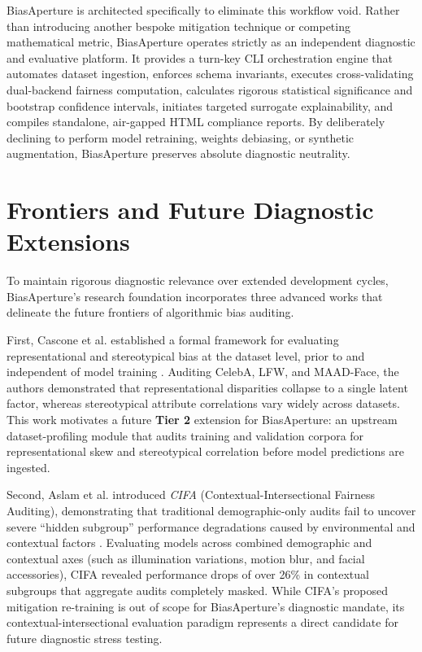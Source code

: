 BiasAperture is architected specifically to eliminate this workflow void. Rather than introducing another bespoke mitigation technique or competing mathematical metric, BiasAperture operates strictly as an independent diagnostic and evaluative platform. It provides a turn-key CLI orchestration engine that automates dataset ingestion, enforces schema invariants, executes cross-validating dual-backend fairness computation, calculates rigorous statistical significance and bootstrap confidence intervals, initiates targeted surrogate explainability, and compiles standalone, air-gapped HTML compliance reports. By deliberately declining to perform model retraining, weights debiasing, or synthetic augmentation, BiasAperture preserves absolute diagnostic neutrality.


\section{Frontiers and Future Diagnostic Extensions}
\label{sec:lit_future_frontiers}

To maintain rigorous diagnostic relevance over extended development cycles, BiasAperture's research foundation incorporates three advanced works that delineate the future frontiers of algorithmic bias auditing.

First, Cascone et al. established a formal framework for evaluating representational and stereotypical bias at the dataset level, prior to and independent of model training \cite{cascone2026framework}. Auditing CelebA, LFW, and MAAD-Face, the authors demonstrated that representational disparities collapse to a single latent factor, whereas stereotypical attribute correlations vary widely across datasets. This work motivates a future \textbf{Tier 2} extension for BiasAperture: an upstream dataset-profiling module that audits training and validation corpora for representational skew and stereotypical correlation before model predictions are ingested.

Second, Aslam et al. introduced \emph{CIFA} (Contextual-Intersectional Fairness Auditing), demonstrating that traditional demographic-only audits fail to uncover severe ``hidden subgroup'' performance degradations caused by environmental and contextual factors \cite{aslam2026cifa}. Evaluating models across combined demographic and contextual axes (such as illumination variations, motion blur, and facial accessories), CIFA revealed performance drops of over 26\% in contextual subgroups that aggregate audits completely masked. While CIFA's proposed mitigation re-training is out of scope for BiasAperture's diagnostic mandate, its contextual-intersectional evaluation paradigm represents a direct candidate for future diagnostic stress testing.

